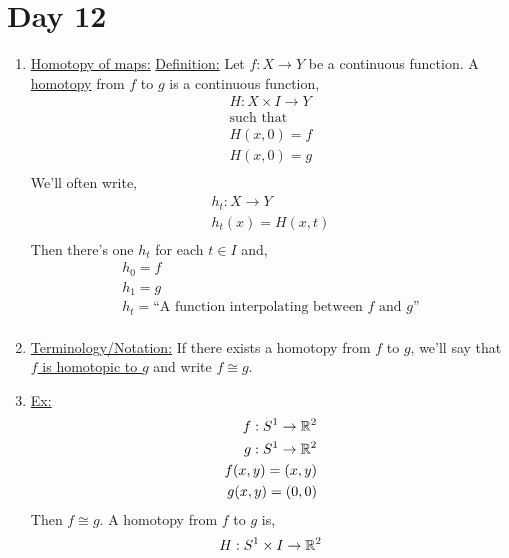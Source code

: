 \section{Day 12}
    \begin{enumerate}
        \item \underline{Homotopy of maps:}
            \underline{Definition:} Let $f: X\rightarrow Y$ be a continuous function.
            A \underline{homotopy} from $f$ to $g$ is a continuous function,
            \begin{align*}
                H:X\times I \rightarrow Y\\
                \text{such that}\\
                H(x,0)=f\\
                H(x,0)=g\\
            \end{align*}
            We'll often write,
            \begin{align*}
                h_t:X \rightarrow Y\\
                h_t(x)=H(x,t)\\
            \end{align*}
            Then there's one $h_t$ for each $t\in I$ and,
            \begin{align*}
                h_0=f\\
                h_1=g\\
                h_t=\text{``A function interpolating between $f$ and $g$''}\\
            \end{align*}
        \item \underline{Terminology/Notation:} If there exists a homotopy from
            $f$ to $g$, we'll say that \underline{$f$ is homotopic to $g$} and write
            $f\cong g$.\\
        \item \underline{Ex:}
            \begin{align*}
                f: S^{1}\rightarrow \mathbb{R}^2\\
                g: S^{1}\rightarrow \mathbb{R}^2\\
                f(x,y)=(x,y)\\
                g(x,y)=(0,0)\\
            \end{align*}
            Then $f\cong g$. A homotopy from $f$ to $g$ is,
            \begin{align*}
                H: S^{1}\times I \rightarrow \R^2\\

\end{align*}
\end{enumerate}
